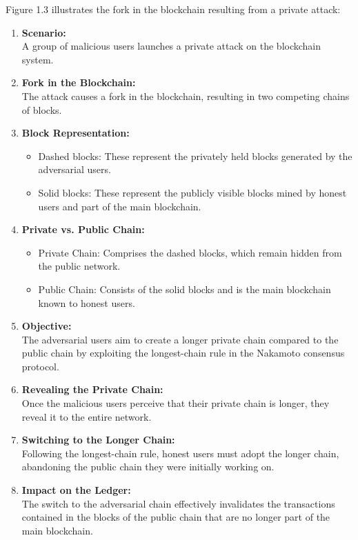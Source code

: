 Figure 1.3 illustrates the fork in the blockchain resulting from a private attack:
\begin{enumerate}
	\item \textbf{Scenario:} \\A group of malicious users launches a private attack on the blockchain system.
	\item \textbf{Fork in the Blockchain:} \\The attack causes a fork in the blockchain, resulting in two competing chains of blocks.
	\item \textbf{Block Representation:} 
	\begin{itemize}
		\item Dashed blocks: These represent the privately held blocks generated by the adversarial users.
		\item Solid blocks: These represent the publicly visible blocks mined by honest users and part of the main blockchain.
	\end{itemize}
	\item \textbf{Private vs. Public Chain:}
	\begin{itemize}
		\item Private Chain: Comprises the dashed blocks, which remain hidden from the public network.
		\item Public Chain: Consists of the solid blocks and is the main blockchain known to honest users.
	\end{itemize}
	\item \textbf{Objective:} \\The adversarial users aim to create a longer private chain compared to the public chain by exploiting the longest-chain rule in the Nakamoto consensus protocol.
	\item \textbf{Revealing the Private Chain:}\\Once the malicious users perceive that their private chain is longer, they reveal it to the entire network.
	\item \textbf{Switching to the Longer Chain:} \\Following the longest-chain rule, honest users must adopt the longer chain, abandoning the public chain they were initially working on.
	\item \textbf{Impact on the Ledger:}\\The switch to the adversarial chain effectively invalidates the transactions contained in the blocks of the public chain that are no longer part of the main blockchain.
\end{enumerate}
